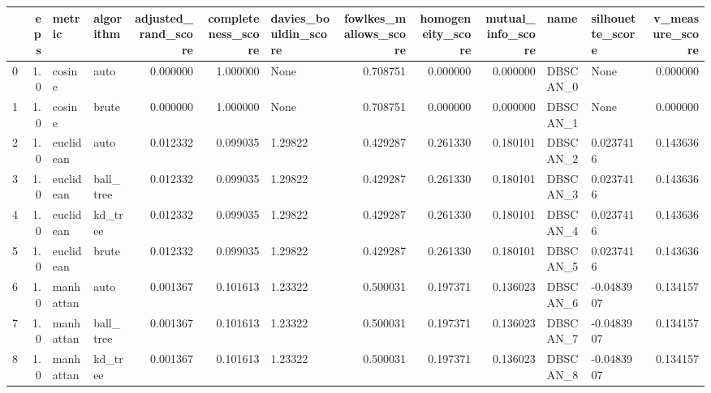 \begin{tabular}{lrllrrlrrrllr}
\toprule
{} &  eps &     metric &  algorithm &  adjusted\_rand\_score &  completeness\_score & davies\_bouldin\_score &  fowlkes\_mallows\_score &  homogeneity\_score &  mutual\_info\_score &       name & silhouette\_score &  v\_measure\_score \\
\midrule
0  &  1.0 &     cosine &       auto &             0.000000 &            1.000000 &                 None &               0.708751 &           0.000000 &           0.000000 &   DBSCAN\_0 &             None &         0.000000 \\
1  &  1.0 &     cosine &      brute &             0.000000 &            1.000000 &                 None &               0.708751 &           0.000000 &           0.000000 &   DBSCAN\_1 &             None &         0.000000 \\
2  &  1.0 &  euclidean &       auto &             0.012332 &            0.099035 &              1.29822 &               0.429287 &           0.261330 &           0.180101 &   DBSCAN\_2 &        0.0237416 &         0.143636 \\
3  &  1.0 &  euclidean &  ball\_tree &             0.012332 &            0.099035 &              1.29822 &               0.429287 &           0.261330 &           0.180101 &   DBSCAN\_3 &        0.0237416 &         0.143636 \\
4  &  1.0 &  euclidean &    kd\_tree &             0.012332 &            0.099035 &              1.29822 &               0.429287 &           0.261330 &           0.180101 &   DBSCAN\_4 &        0.0237416 &         0.143636 \\
5  &  1.0 &  euclidean &      brute &             0.012332 &            0.099035 &              1.29822 &               0.429287 &           0.261330 &           0.180101 &   DBSCAN\_5 &        0.0237416 &         0.143636 \\
6  &  1.0 &  manhattan &       auto &             0.001367 &            0.101613 &              1.23322 &               0.500031 &           0.197371 &           0.136023 &   DBSCAN\_6 &       -0.0483907 &         0.134157 \\
7  &  1.0 &  manhattan &  ball\_tree &             0.001367 &            0.101613 &              1.23322 &               0.500031 &           0.197371 &           0.136023 &   DBSCAN\_7 &       -0.0483907 &         0.134157 \\
8  &  1.0 &  manhattan &    kd\_tree &             0.001367 &            0.101613 &              1.23322 &               0.500031 &           0.197371 &           0.136023 &   DBSCAN\_8 &       -0.0483907 &         0.134157 \\

\end{tabular}
